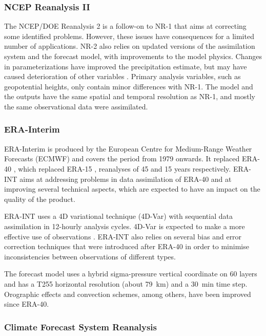 \documentclass{ametsoc}
\begin{document}
\subsubsection{NCEP Reanalysis II}

The NCEP/DOE Reanalysis 2 \citep[NR-2 --][]{Kanamitsu2002} is a follow-on to NR-1 that aims at correcting some identified problems. However, these issues have consequences for a limited number of applications. NR-2 also relies on updated versions of the assimilation system and the forecast model, with improvements to the model physics. Changes in parameterizations have improved the precipitation estimate, but may have caused deterioration of other variables \citep{Kistler2001, Kanamitsu2002}. Primary analysis variables, such as geopotential heights, only contain minor differences with NR-1. The model and the outputs have the same spatial and temporal resolution as NR-1, and mostly the same observational data were assimilated.


\subsubsection{ERA-Interim}

ERA-Interim \citep[ERA-INT --][]{Dee2011a} is produced by the European Centre for Medium-Range Weather Forecasts (ECMWF) and covers the period from 1979 onwards. It replaced ERA-40 \citep{Uppala2005}, which replaced ERA-15 \citep{Gibson1997}, reanalyses of 45 and 15 years respectively. ERA-INT aims at addressing problems in data assimilation of ERA-40 and at improving several technical aspects, which are expected to have an impact on the quality of the product.

ERA-INT uses a 4D variational technique (4D-Var) with sequential data assimilation in 12-hourly analysis cycles. 4D-Var is expected to make a more effective use of observations \citep{Dee2011a}. ERA-INT also relies on several bias and error correction techniques that were introduced after ERA-40 in order to minimise inconsistencies between observations of different types.

The forecast model uses a hybrid sigma-pressure vertical coordinate on 60 layers and has a T255 horizontal resolution (about 79~km) and a 30~min time step. Orographic effects and convection schemes, among others, have been improved since ERA-40.


\subsubsection{Climate Forecast System Reanalysis}
\end{document}
